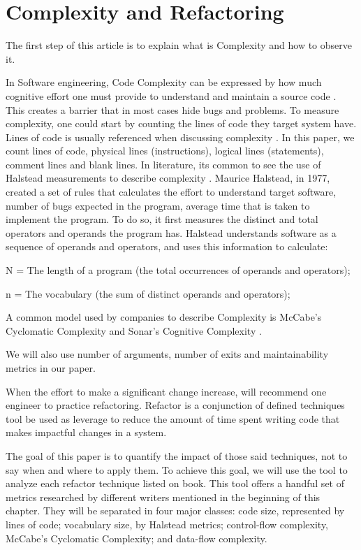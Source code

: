 \section{Complexity and Refactoring}

The first step of this article is to explain what is Complexity and how to observe it.

In Software engineering, Code Complexity can be expressed by how much cognitive effort one must provide to understand
and maintain a source code \cite{article:fmricc}. This creates a barrier that in most cases hide bugs and problems.
To measure complexity, one could start by counting the lines of code they target system have. Lines of code is usually
referenced when discussing complexity \cite{article:rustcc}. In this paper, we count lines of code, physical lines (instructions),
logical lines (statements), comment lines and blank lines.
In literature, its common to see the use of Halstead measurements to describe complexity \cite{article:complexity_with_halstead}.
Maurice Halstead, in 1977, created a set of rules that calculates the effort to understand target software, number of bugs
expected in the program, average time that is taken to implement the program. To do so, it first measures the distinct and total
operators and operands the program has. Halstead understands software as a sequence of operands and operators, and uses
this information to calculate:

N = The length of a program (the total occurrences of operands and operators);

n = The vocabulary (the sum of distinct operands and operators);


A common model used by companies to describe Complexity is McCabe's Cyclomatic Complexity and Sonar's Cognitive Complexity
\cite{article:sonarpaper}.

We will also use number of arguments, number of exits and maintainability metrics in our paper.


When the effort to make a significant change increase, \cite{book:refactoring} will recommend one engineer to practice
refactoring. Refactor is a conjunction of defined techniques tool be used as leverage to reduce the amount of time spent
writing code that makes impactful changes in a system.

The goal of this paper is to quantify the impact of those said techniques, not to say when and where to apply them.
To achieve this goal, we will use the \cite{article:mozilla} tool to analyze each refactor technique listed on
\cite{book:refactoring} book. This tool offers a handful set of metrics researched by
different writers mentioned in the beginning of this chapter. They will be separated in four major classes: code size,
represented by lines of code; vocabulary size, by Halstead metrics; control-flow complexity, McCabe's Cyclomatic
Complexity; and data-flow complexity.

